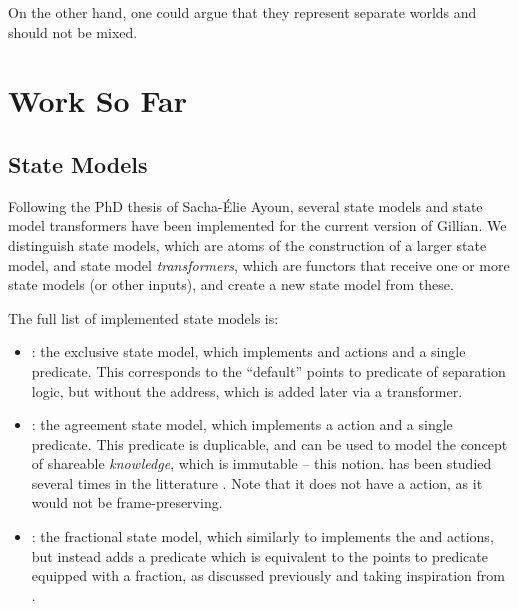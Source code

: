 On the other hand, one could argue that they represent separate worlds and should not be mixed. 

\section{Work So Far}

\subsection{State Models}
\label{sec:state-models-work}

Following the PhD thesis of Sacha-Élie Ayoun, several state models and state model transformers have been implemented for the current version of Gillian. We distinguish state models, which are atoms of the construction of a larger state model, and state model \emph{transformers}, which are functors that receive one or more state models (or other inputs), and create a new state model from these.

The full list of implemented state models is: \begin{itemize}
	\item {}: the exclusive state model, which implements  and  actions and a single  predicate. This corresponds to the ``default'' points to predicate of separation logic, but without the address, which is added later via a transformer.
	\item {}: the agreement state model, which implements a  action and a single  predicate. This predicate is duplicable, and can be used to model the concept of shareable \emph{knowledge}, which is immutable -- this notion. has been studied several times in the litterature \cite{higherorderseplogic, statesoundness, monotonicstate, iris}. Note that it does not have a  action, as it would not be frame-preserving.
	\item {}: the fractional state model, which similarly to  implements the  and  actions, but instead adds a  predicate which is equivalent to the points to predicate equipped with a fraction, as discussed previously and taking inspiration from \cite{fracpermissions, fracpermissions2}.
\end{itemize}

